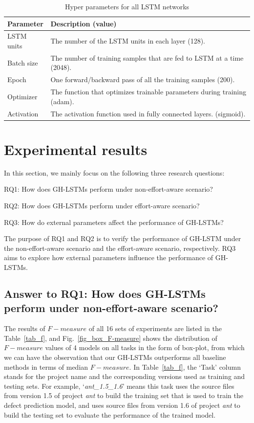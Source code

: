 \documentclass[journal]{IEEEtran}
\begin{document}
\begin{table}[htbp]
	\footnotesize
	\caption{Hyper parameters for all LSTM networks}
	\label{tab_parameters}
	\tabcolsep 40pt
	\centering
	\begin{tabular}{ll}
		\toprule
		Parameter      & Description (value) \\\midrule
		LSTM units     & The number of the LSTM units in each layer (128). \\
		Batch size     & The number of training samples that are fed to LSTM at a time (2048). \\
		Epoch          & One forward/backward pass of all the training samples (200).         \\
		Optimizer      & The function that optimizes trainable parameters during training (adam).         \\
		Activation     & The activation function used in fully connected layers. (sigmoid).\\
		\bottomrule
	\end{tabular}
\end{table}

\section{Experimental results}
In this section, we mainly focus on the following three research questions:

RQ1: How does GH-LSTMs perform under non-effort-aware scenario?

RQ2: How does GH-LSTMs perform under effort-aware scenario?

RQ3: How do external parameters affect the performance of GH-LSTMs?

The purpose of RQ1 and RQ2 is to verify the performance of GH-LSTM under the non-effort-aware scenario and the effort-aware scenario, respectively. RQ3 aims to explore how external parameters influence the performance of GH-LSTMs.

\subsection{Answer to RQ1: How does GH-LSTMs perform under non-effort-aware scenario?}

The results of $F-measure$ of all 16 sets of experiments are listed in the Table~\ref{tab_f}, and Fig.~\ref{fig_box_F-measure} shows the distribution of $F-measure$ values of 4 models on all tasks in the form of box-plot, from which we can have the observation that our GH-LSTMs outperforms all baseline methods in terms of median $F-measure$. In Table~\ref{tab_f}, the `Task' column stands for the project name and the corresponding versions used as training and testing sets. For example, `\textit{ant\_1.5\_1.6}' means this task uses the source files from version 1.5 of project \textit{ant} to build the training set that is used to train the defect prediction model, and uses source files from version 1.6 of project \textit{ant} to build the testing set to evaluate the performance of the trained model.
\end{document}
